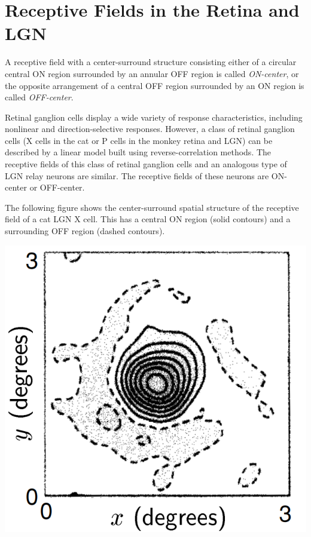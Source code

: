 \section{Receptive Fields in the Retina and LGN}
\label{sec:ReceptiveFieldsInTheRetinaAndLGN}

\begin{defn}
  \label{def:ReceptiveFieldtype}
  A receptive field with a center-surround structure consisting either of a circular central ON region surrounded by an annular OFF region is called \emph{ON-center}, or the opposite arrangement of a central OFF region surrounded by an ON region is called \emph{OFF-center}.
\end{defn}

\begin{rem}
  Retinal ganglion cells display a wide variety of response characteristics, including nonlinear and direction-selective responses. However, a class of retinal ganglion cells (X cells in the cat or P cells in the monkey retina and LGN) can be described by a linear model built using reverse-correlation methods. The receptive fields of this class of retinal ganglion cells and an analogous type of LGN relay neurons are similar. The receptive fields of these neurons are ON-center or OFF-center.
\end{rem}

\begin{exm}
  \label{exm:ONcenterExm}
  The following figure shows the center-surround spatial structure of the receptive field of a cat LGN X cell. This has a central ON region (solid contours) and a surrounding OFF region (dashed contours).
  \begin{center}
    \includegraphics[scale=0.2]{./png/ONcenterExm}
  \end{center}
\end{exm}

